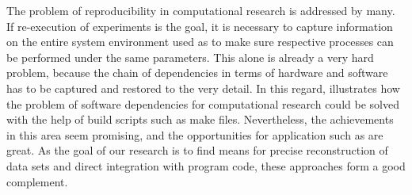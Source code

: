 \documentclass{acm_proc_article-sp}
\begin{document}
The problem of reproducibility in computational research is addressed by many.
If re-execution of experiments is the goal, it is necessary to capture information on the entire system environment used as to make sure respective processes can be performed under the same parameters.
%
%
%
\cite{DBLP_conf_ercimdl_Rauber12}
\cite{Rechert_2010_EBS_1816123_1816182}
This alone is already a very hard problem, because the chain of dependencies in terms of hardware and software has to be captured and restored to the very detail.
In this regard, \cite{Schwab_2000_MSC_369545_369555} illustrates how the problem of software dependencies for computational research could be solved with the help of build scripts such as make files.
Nevertheless, the achievements in this area seem promising, and the opportunities for application such as  
%
%
%
\cite{Nowakowski2011608} %
%
are great. %
As the goal of our research is to find means for precise reconstruction of data sets and direct integration with program code, these approaches form a good complement. %
\end{document}
